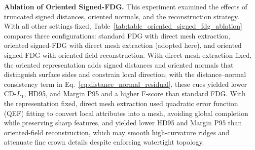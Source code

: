 \documentclass[preprint,review,12pt]{elsarticle}
\begin{document}
\textbf{Ablation of Oriented Signed-FDG.} This experiment examined the effects of truncated signed distances, oriented normals, and the reconstruction strategy. With all other settings fixed, Table~\ref{tab:table_oriented_signed_fdg_ablation} compares three configurations: standard FDG with direct mesh extraction, oriented signed-FDG with direct mesh extraction (adopted here), and oriented signed-FDG with oriented-field reconstruction. With direct mesh extraction fixed, the oriented representation adds signed distances and oriented normals that distinguish surface sides and constrain local direction; with the distance--normal consistency term in Eq.~\eqref{eq:distance_normal_residual}, these cues yielded lower CD-$L_1$, HD95, and Margin P95 and a higher F-score than standard FDG. With the representation fixed, direct mesh extraction used quadratic error function (QEF) fitting to convert local attributes into a mesh, avoiding global completion while preserving sharp features, and yielded lower HD95 and Margin P95 than oriented-field reconstruction, which may smooth high-curvature ridges and attenuate fine crown details despite enforcing watertight topology.
\end{document}
